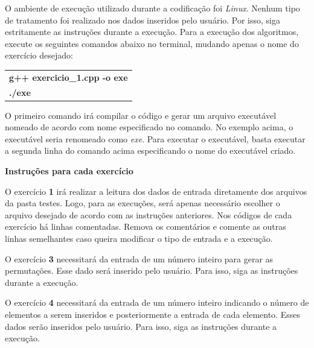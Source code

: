\documentclass[12pt,a4paper]{article}
\begin{document}
O ambiente de execução utilizado durante a codificação foi \textit{Linux}. Nenhum tipo de tratamento foi realizado nos dados inseridos pelo usuário. Por isso, siga estritamente as instruções durante a execução. Para a execução dos algoritmos, execute os seguintes comandos abaixo no terminal, mudando apenas o nome do exercício desejado:

\begin{table}[H]
	\centering
	\begin{tabular}{|l|}
		\hline
		\textbf{g++ exercicio\_1.cpp -o exe}\\		
		\textbf{./exe}\\
		\hline
	\end{tabular}
\end{table}

O primeiro comando irá compilar o código e gerar um arquivo executável nomeado de acordo com nome especificado no comando. No exemplo acima, o executável seria renomeado como \textit{exe}. Para executar o executável, basta executar a segunda linha do comando acima especificando o nome do executável criado.

\newpage

{\Large \textbf{Instruções para cada exercício}}

\vspace{0.5cm}


O exercício \textbf{1} irá realizar a leitura dos dados de entrada diretamente dos arquivos da pasta \textsf{testes}. Logo, para as execuções, será apenas necessário escolher o arquivo desejado de acordo com as instruções anteriores. Nos códigos de cada exercício há linhas comentadas. Remova os comentários e comente as outras linhas semelhantes caso queira modificar o tipo de entrada e a execução.

O exercício \textbf{3} necessitará da entrada de um número inteiro para gerar as permutações. Esse dado será inserido pelo usuário. Para isso, siga as instruções durante a execução.

O exercício \textbf{4} necessitará da entrada de um número inteiro indicando o número de elementos a serem inseridos e posteriormente a entrada de cada elemento. Esses dados serão inseridos pelo usuário. Para isso, siga as instruções durante a execução.
\end{document}
